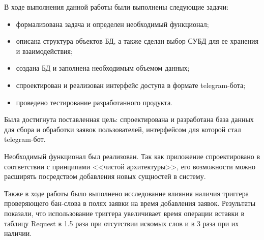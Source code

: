 
В ходе выполнения данной работы были выполнены следующие задачи:
\begin{itemize}
	\item формализована задача и определен необходимый функционал;
	\item описана структура объектов БД, а также сделан выбор СУБД для ее хранения и взаимодействия;
	\item создана БД и заполнена необходимым объемом данных;
	\item спроектирован и реализован интерфейс доступа в формате telegram-бота;
	\item проведено тестирование разработанного продукта.
\end{itemize}

Была достигнута поставленная цель: спроектирована и разработана база данных для сбора и обработки заявок пользователей, интерфейсом для которой стал telegram-бот.

Необходимый функционал был реализован. Так как приложение спроектировано в соответствии с принципами <<чистой архитектуры>>, его возможности можно расширять посредством добавления новых сущностей в систему.

Также в ходе работы было выполнено исследование влияния наличия триггера проверяющего бан-слова в полях заявки на время добавления заявок. Результаты показали, что использование триггера увеличивает время операции вставки в таблицу Request в 1.5 раза при отсутствии искомых слов и в 3 раза при их наличии.